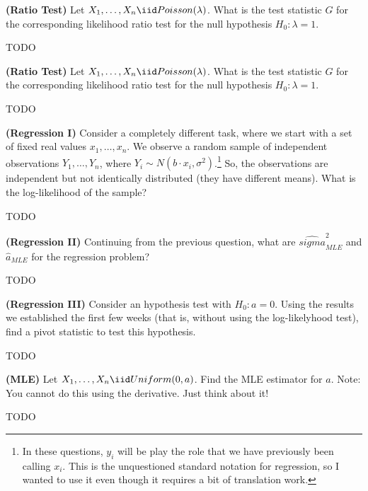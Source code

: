 
\textbf{(Ratio Test)} Let $X_1, \ldots, X_n \iid Poisson(\lambda)$.
What is the test statistic $G$ for the corresponding likelihood 
ratio test for the null hypothesis $H_0: \lambda = 1$.


TODO


\textbf{(Ratio Test)} Let $X_1, \ldots, X_n \iid Poisson(\lambda)$.
What is the test statistic $G$ for the corresponding likelihood 
ratio test for the null hypothesis $H_0: \lambda = 1$.


TODO


\textbf{(Regression I)} Consider a completely different task, where we start
with a set of fixed real values $x_1, \ldots, x_n$. We observe a random
sample of independent observations $Y_1, \ldots, Y_n$, where
$Y_i \sim N(b \cdot x_i, \sigma^2)$.\footnote{
  In these questions, $y_i$ will be play the role that we have previously
  been calling $x_i$. This is the unquestioned standard notation for regression,
  so I wanted to use it even though it requires a bit of translation work.
} So, the observations are independent but not identically distributed (they
have different means). What is the log-likelihood of the sample?


TODO



\textbf{(Regression II)} Continuing from the previous question, what are
$\hat{sigma}_{MLE}^2$ and $\hat{a}_{MLE}$ for the regression problem?


TODO


\textbf{(Regression III)} Consider an hypothesis test with $H_0: a = 0$. 
Using the results we established the first few weeks (that is, without using the
log-likelyhood test), find a pivot statistic to test this hypothesis. 


TODO


\textbf{(MLE)} Let $X_1, \ldots, X_n \iid Uniform(0, a)$. Find the MLE estimator
for $a$. Note: You cannot do this using the derivative. Just think about it!


TODO
